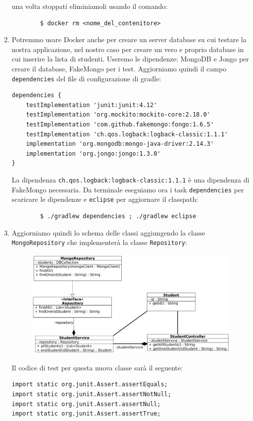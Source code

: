 \begin{enumerate}
\begin{verbatim}
    \end{verbatim}
    una volta stoppati eliminiamoli usando il comando:
    \begin{verbatim}
        $ docker rm <nome_del_contenitore>
    \end{verbatim}
    \item Potremmo usare Docker anche per creare un server database su cui testare la nostra applicazione, nel nostro caso per creare un vero e proprio database in cui inserire la lista di studenti. Useremo le dipendenze: MongoDB e Jongo per creare il database, FakeMongo per i test. Aggiorniamo quindi il campo \texttt{dependencies} del file di configurazione di gradle:
    \begin{lstlisting}[frame=single]
dependencies {
    testImplementation 'junit:junit:4.12'
    testImplementation 'org.mockito:mockito-core:2.18.0'
    testImplementation 'com.github.fakemongo:fongo:1.6.5'
    testImplementation 'ch.qos.logback:logback-classic:1.1.1'
    implementation 'org.mongodb:mongo-java-driver:2.14.3'
    implementation 'org.jongo:jongo:1.3.0'
}
    \end{lstlisting}
    La dipendenza \texttt{ch.qos.logback:logback-classic:1.1.1} è una dipendenza di FakeMongo necessaria. Da terminale eseguiamo ora i task \texttt{dependencies} per scaricare le dipendenze e \texttt{eclipse} per aggiornare il classpath:
    \begin{verbatim}
        $ ./gradlew dependencies ; ./gradlew eclipse
    \end{verbatim}
    \item Aggiorniamo quindi lo schema delle classi aggiungendo la classe \texttt{MongoRepository} che implementerà la classe \texttt{Repository}:
    \begin{figure}[H]
    \centering
    \includegraphics[width=1.1\linewidth]{4IntegrationWithOtherTool/tutorial/classDiagramm2.png}
  \end{figure}
  Il codice di test per questa nuova classe sarà il seguente:
  \begin{lstlisting}[frame=single]
import static org.junit.Assert.assertEquals;
import static org.junit.Assert.assertNotNull;
import static org.junit.Assert.assertNull;
import static org.junit.Assert.assertTrue;


\end{lstlisting}
\end{enumerate}
